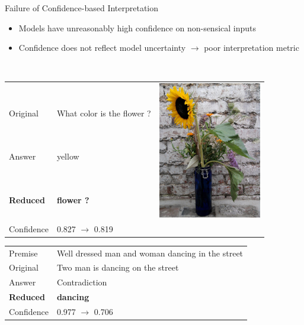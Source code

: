 \documentclass[final]{beamer} %
\begin{document}
\begin{frame}
\begin{columns}
\begin{column}{.5\linewidth}
\begin{block}{Failure of Confidence-based Interpretation}
\vspace{0.3cm}

\begin{itemize}
\item Models have unreasonably high confidence on non-sensical inputs~\cite{feng2018rawr}
\item Confidence does not reflect model uncertainty $\to$ poor interpretation metric
\end{itemize}

\vspace{0.6cm}
 \\
\vspace{0.3cm}
\begin{tabular}{lp{}p{}}
& & \multirow{4}{*}{\includegraphics[height=6cm]{figures/vqa_example}}\\ 
Original & What color is the flower ? \\
Answer & yellow \\
\textbf{Reduced} & \textbf{flower ?} \\
Confidence & 0.827 $\to$ 0.819  \\
\end{tabular}

\vspace{0.3cm}
\begin{center}
\begin{tabular}{lp{}}
Premise & Well dressed man and woman dancing in the street \\
Original & Two man is dancing on the street \\
Answer & Contradiction \\
\textbf{Reduced} & \textbf{dancing} \\
Confidence & 0.977 $\to$ 0.706 \\
\end{tabular}


\end{center}
\end{block}
\end{column}
\end{columns}
\end{frame}
\end{document}
